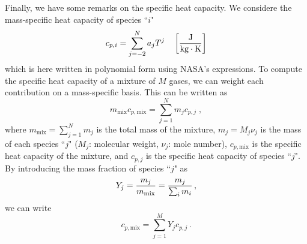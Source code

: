 Finally, we have some remarks on the specific heat capacity. We considere the mass-specific heat capacity of species ``$i$"
\[
  c_{p, i} = \sum_{j = -2}^N a_j T^j \quad \left[{\frac{\text{J}}{\text{kg} \cdot \text{K}}}\right]
\]
which is here written in polynomial form using NASA's expressions. To compute the specific heat capacity of a mixture of $M$ gases, we can weight each contribution on a mass-specific basis. This can be written as
\[
  m_\text{mix} c_{p, \text{mix}} = \sum_{j = 1}^N m_j c_{p,j}\;,
\] 
where $m_\text{mix} = \sum_{j = 1}^N m_j$ is the total mass of the mixture, $m_j = M_j \nu_j$ is the mass of each species ``$j$" ($M_j$: molecular weight, $\nu_j$: mole number), $c_{p, \text{mix}}$ is the specific heat capacity of the mixture, and $c_{p, j}$ is the specific heat capacity of species ``$j$". By introducing the mass fraction of species ``$j$" as
\[
  Y_j = {\frac{m_j}{m_\text{mix}}} = {\frac{m_j}{\sum_i m_i}}\,,
\]
we  can write
\[
  c_{p,\text{mix}} = \sum_{j = 1}^M Y_j c_{p, j}\,.
\]



